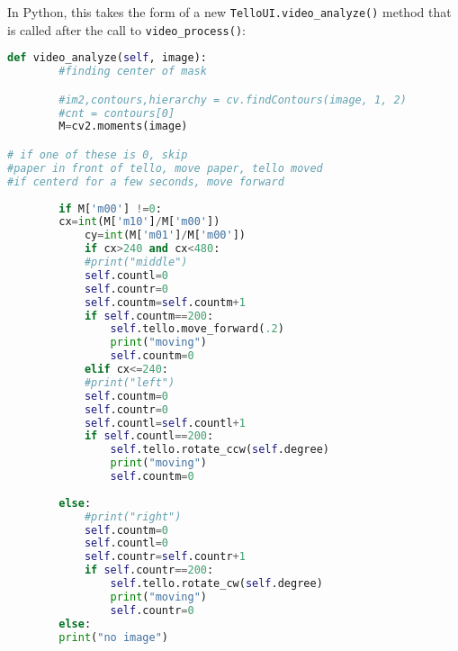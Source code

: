 In Python, this takes the form of a new \lstinline{TelloUI.video_analyze()} method that is called after the call to \lstinline{video_process()}:
\begin{lstlisting}[language=python]
    def video_analyze(self, image):
	    #finding center of mask

	    #im2,contours,hierarchy = cv.findContours(image, 1, 2)
	    #cnt = contours[0]
	    M=cv2.moments(image)

# if one of these is 0, skip
#paper in front of tello, move paper, tello moved
#if centerd for a few seconds, move forward
	    
	    if M['m00'] !=0:
		cx=int(M['m10']/M['m00'])
	    	cy=int(M['m01']/M['m00'])
	    	if cx>240 and cx<480:
			#print("middle")
			self.countl=0
			self.countr=0
			self.countm=self.countm+1
			if self.countm==200:
				self.tello.move_forward(.2)
				print("moving")
				self.countm=0
	    	elif cx<=240:
			#print("left")
			self.countm=0
			self.countr=0
			self.countl=self.countl+1
			if self.countl==200:
				self.tello.rotate_ccw(self.degree)
				print("moving")
				self.countm=0
			
		else:
			#print("right")
			self.countm=0
			self.countl=0
			self.countr=self.countr+1
			if self.countr==200:
				self.tello.rotate_cw(self.degree)
				print("moving")
				self.countr=0
	    else:
		print("no image")
\end{lstlisting}

